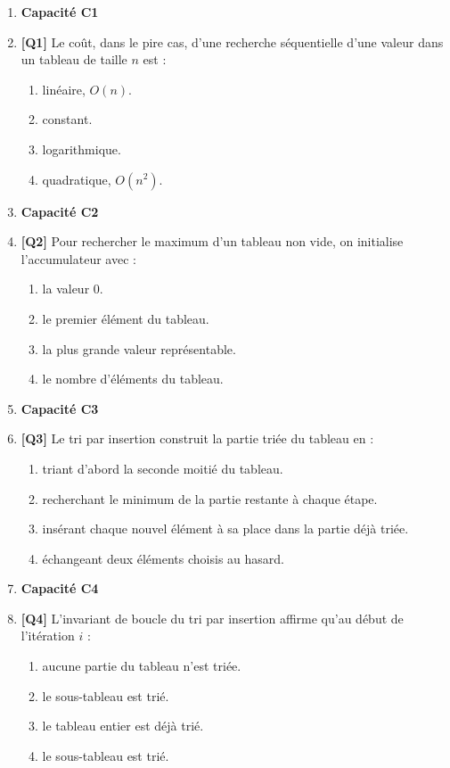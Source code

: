 \begin{enumerate}

\item[] \textbf{Capacité C1}

\item \textbf{[Q1]} Le coût, dans le pire cas, d'une recherche séquentielle d'une valeur dans un tableau de taille $n$ est :
  \begin{enumerate}[label=\Alph*.]
    \item linéaire, $O(n)$.
    \item constant.
    \item logarithmique.
    \item quadratique, $O(n^2)$.
  \end{enumerate}

\item[] \textbf{Capacité C2}

\item \textbf{[Q2]} Pour rechercher le maximum d'un tableau non vide, on initialise l'accumulateur avec :
  \begin{enumerate}[label=\Alph*.]
    \item la valeur $0$.
    \item le premier élément du tableau.
    \item la plus grande valeur représentable.
    \item le nombre d'éléments du tableau.
  \end{enumerate}

\item[] \textbf{Capacité C3}

\item \textbf{[Q3]} Le tri par insertion construit la partie triée du tableau en :
  \begin{enumerate}[label=\Alph*.]
    \item triant d'abord la seconde moitié du tableau.
    \item recherchant le minimum de la partie restante à chaque étape.
    \item insérant chaque nouvel élément à sa place dans la partie déjà triée.
    \item échangeant deux éléments choisis au hasard.
  \end{enumerate}

\item[] \textbf{Capacité C4}

\item \textbf{[Q4]} L'invariant de boucle du tri par insertion affirme qu'au début de l'itération $i$ :
  \begin{enumerate}[label=\Alph*.]
    \item aucune partie du tableau n'est triée.
    \item le sous-tableau  est trié.
    \item le tableau entier est déjà trié.
    \item le sous-tableau  est trié.
  \end{enumerate}


\end{enumerate}
